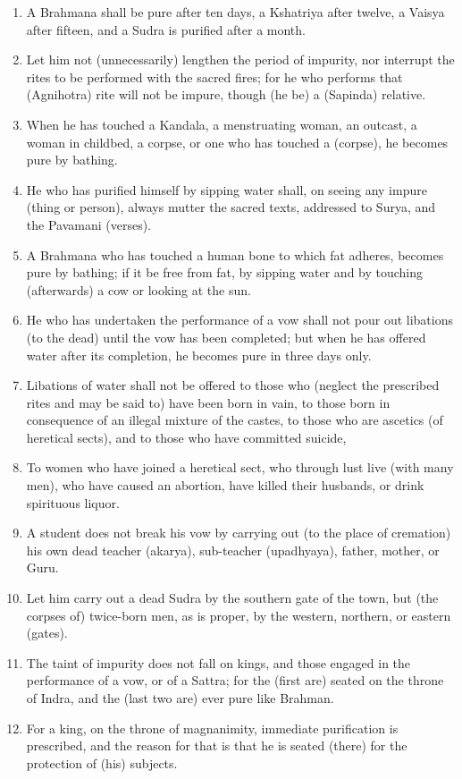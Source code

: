 \begin{enumerate}
\item A Brahmana shall be pure after ten days, a Kshatriya after twelve, a Vaisya after fifteen, and a Sudra is purified after a month.
\item Let him not (unnecessarily) lengthen the period of impurity, nor interrupt the rites to be performed with the sacred fires; for he who performs that (Agnihotra) rite will not be impure, though (he be) a (Sapinda) relative.
\item When he has touched a Kandala, a menstruating woman, an outcast, a woman in childbed, a corpse, or one who has touched a (corpse), he becomes pure by bathing.
\item He who has purified himself by sipping water shall, on seeing any impure (thing or person), always mutter the sacred texts, addressed to Surya, and the Pavamani (verses).
\item A Brahmana who has touched a human bone to which fat adheres, becomes pure by bathing; if it be free from fat, by sipping water and by touching (afterwards) a cow or looking at the sun.
\item He who has undertaken the performance of a vow shall not pour out libations (to the dead) until the vow has been completed; but when he has offered water after its completion, he becomes pure in three days only.
\item Libations of water shall not be offered to those who (neglect the prescribed rites and may be said to) have been born in vain, to those born in consequence of an illegal mixture of the castes, to those who are ascetics (of heretical sects), and to those who have committed suicide,
\item To women who have joined a heretical sect, who through lust live (with many men), who have caused an abortion, have killed their husbands, or drink spirituous liquor.
\item A student does not break his vow by carrying out (to the place of cremation) his own dead teacher (akarya), sub-teacher (upadhyaya), father, mother, or Guru.
\item Let him carry out a dead Sudra by the southern gate of the town, but (the corpses of) twice-born men, as is proper, by the western, northern, or eastern (gates).
\item The taint of impurity does not fall on kings, and those engaged in the performance of a vow, or of a Sattra; for the (first are) seated on the throne of Indra, and the (last two are) ever pure like Brahman.
\item For a king, on the throne of magnanimity, immediate purification is prescribed, and the reason for that is that he is seated (there) for the protection of (his) subjects.

\end{enumerate}
